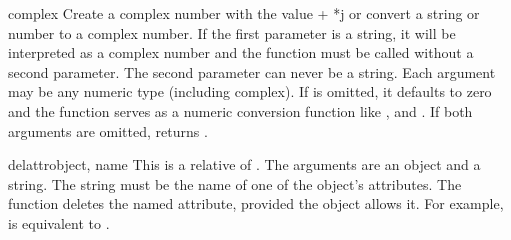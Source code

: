 \begin{funcdesc}{complex}{}
  Create a complex number with the value  + *j or
  convert a string or number to a complex number.  If the first
  parameter is a string, it will be interpreted as a complex number
  and the function must be called without a second parameter.  The
  second parameter can never be a string.
  Each argument may be any numeric type (including complex).
  If  is omitted, it defaults to zero and the function
  serves as a numeric conversion function like ,
   and .  If both arguments
  are omitted, returns .
\end{funcdesc}

\begin{funcdesc}{delattr}{object, name}
  This is a relative of .  The arguments are an
  object and a string.  The string must be the name
  of one of the object's attributes.  The function deletes
  the named attribute, provided the object allows it.  For example,
   is equivalent to
  .
\end{funcdesc}


